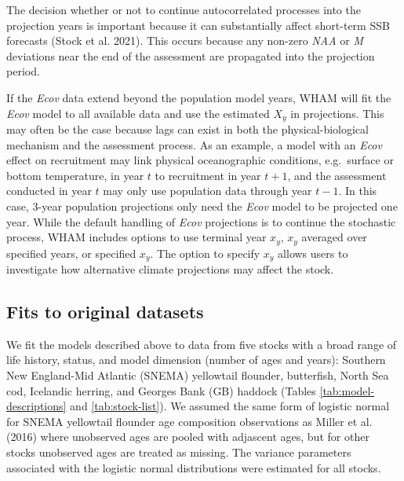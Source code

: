 \documentclass[]{article}
\begin{document}
The decision whether or not to continue autocorrelated processes into
the projection years is important because it can substantially affect
short-term SSB forecasts (Stock et al. 2021). This occurs because any
non-zero \emph{NAA} or \emph{M} deviations near the end of the
assessment are propagated into the projection period.

If the \emph{Ecov} data extend beyond the population model years, WHAM
will fit the \emph{Ecov} model to all available data and use the
estimated \(X_y\) in projections. This may often be the case because
lags can exist in both the physical-biological mechanism and the
assessment process. As an example, a model with an \emph{Ecov} effect on
recruitment may link physical oceanographic conditions, e.g.~surface or
bottom temperature, in year \(t\) to recruitment in year \(t+1\), and
the assessment conducted in year \(t\) may only use population data
through year \(t-1\). In this case, 3-year population projections only
need the \emph{Ecov} model to be projected one year. While the default
handling of \emph{Ecov} projections is to continue the stochastic
process, WHAM includes options to use terminal year \(x_y\), \(x_y\)
averaged over specified years, or specified \(x_y\). The option to
specify \(x_y\) allows users to investigate how alternative climate
projections may affect the stock.

\hypertarget{fits-to-original-datasets}{%
\subsection{Fits to original datasets}\label{fits-to-original-datasets}}

We fit the models described above to data from five stocks with a broad
range of life history, status, and model dimension (number of ages and
years): Southern New England-Mid Atlantic (SNEMA) yellowtail flounder,
butterfish, North Sea cod, Icelandic herring, and Georges Bank (GB)
haddock (Tables \ref{tab:model-descriptions} and \ref{tab:stock-list}).
We assumed the same form of logistic normal for SNEMA yellowtail
flounder age composition observations as Miller et al. (2016) where
unobserved ages are pooled with adjascent ages, but for other stocks
unobserved ages are treated as missing. The variance parameters
associated with the logistic normal distributions were estimated for all
stocks.
\end{document}
